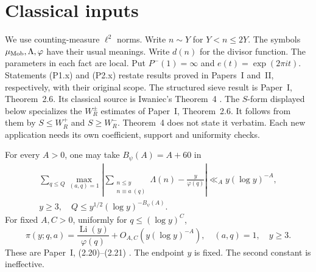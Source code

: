 \section{Classical inputs}\label{sec:classical-inputs}
\raggedbottom

We use counting-measure $\ell^2$ norms. Write $n\sim Y$ for $Y<n\le2Y$.
The symbols $\mu_{\rm Mob},\Lambda,\varphi$ have their usual meanings.
Write $d(n)$ for the divisor function.
The parameters in each fact are local.
Put $P^-(1)=\infty$ and $e(t)=\exp(2\pi it)$.
Statements (P1.x) and (P2.x) restate results proved in
Papers~I and~II, respectively, with their original scope.
The structured sieve result is Paper~I, Theorem~2.6.
Its classical source is Iwaniec's Theorem~4
\cite[Theorem~4]{Iwaniec1980Remainder}. The \(S\)-form displayed below
specializes the \(W_R^\pm\) estimates of Paper~I, Theorem~2.6.
It follows from them by \(S\le W_R^+\) and \(S\ge W_R^-\).
Theorem~4 does not state it verbatim.
Each new application needs its own coefficient, support and
uniformity checks.

\begin{fact}\label{fact:prime-estimates}
For every $A>0$, one may take $B_\psi(A)=A+60$ in
\begin{equation}\label{eq:classical-bv}
 \begin{gathered}
 \sum_{q\le Q}\max_{(a,q)=1}
 \left|\sum_{\substack{n\le y\\n\equiv a\ (q)}}\Lambda(n)
                -\frac y{\varphi(q)}\right|
 \ll_A y(\log y)^{-A},\\
 y\ge3,\quad Q\le y^{1/2}(\log y)^{-B_\psi(A)}.
 \end{gathered}
\end{equation}
For fixed $A,C>0$, uniformly for $q\le(\log y)^C$,
\begin{equation}\label{eq:classical-sw}
 \pi(y;q,a)=\frac{\operatorname{Li}(y)}{\varphi(q)}
       +O_{A,C}(y(\log y)^{-A}),\quad (a,q)=1,\quad y\ge3.
\end{equation}
These are Paper~I, (2.20)--(2.21) \cite[(2.20)--(2.21), p.~9]{PaperI}.
The endpoint $y$ is fixed. The second constant is ineffective.
\end{fact}

